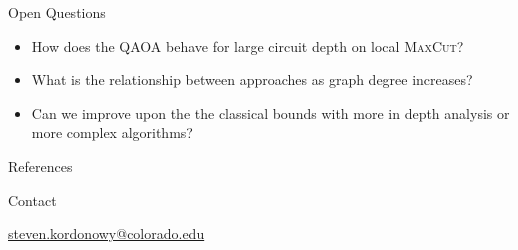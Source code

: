 \documentclass[final]{beamer}
\newlength{\onecolwid}
\begin{document}
\begin{frame}[t]
\begin{columns}[t]
\begin{column}{\onecolwid}
\vspace{-1.2in}
\begin{block}{Open Questions}


\begin{itemize}
\item How does the QAOA behave for large circuit depth on local \textsc{MaxCut}?
\item What is the relationship between approaches as graph degree increases?
\item Can we improve upon the the classical bounds with more in depth analysis or more complex algorithms?
\end{itemize}

\end{block}


\vspace{-.8in}
\begin{block}{References}

\footnotesize{

}

\end{block}

\begin{block}{Contact}

    \href{mailto:steven.kordonowy@colorado.edu}{steven.kordonowy@colorado.edu}
    
\end{block}





\end{column} %

\end{columns} %

\end{frame} %
\end{document}
